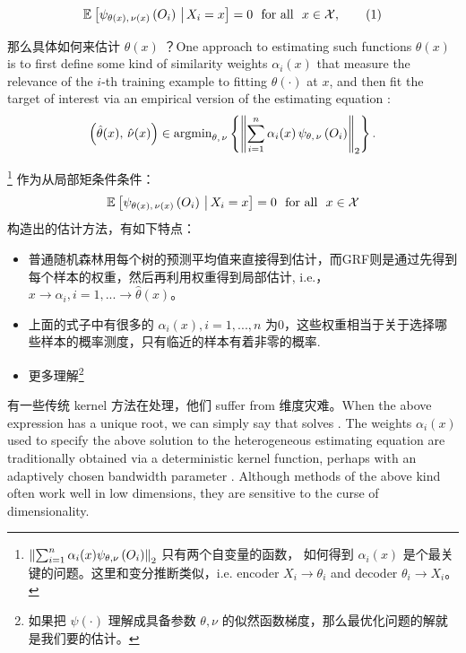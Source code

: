 \documentclass[aos]{imsart}
\theoremstyle{plain}
\theoremstyle{definition}
\theoremstyle{remark}
\begin{document}
\begin{CJK}{UTF8}{gbsn}
\begin{equation*}
\EE{\psi_{\theta(x), \, \nu(x)}\p{O_i} \cond X_i = x} = 0 \ \text{ for all } \ x \in \xx, \qquad (1)
\end{equation*}


那么具体如何来估计 $\theta(x)$ ？One approach to estimating such functions $\theta(x)$ is to first define
some kind of similarity weights $\alpha_i(x)$ that measure the relevance of the $i$-th training example to
fitting $\theta(\cdot)$ at $x$, and then fit the target of interest via an empirical version of
the estimating equation
\citep{fan1998local,newey1994kernel,staniswalis1989kernel,stone1977consistent,tibshirani1987local}:
\begin{equation}
\label{eq:gee_estimate}
\p{\htheta(x), \, \hnu(x)} \in \argmin_{\theta, \, \nu} \cb{\Norm{\sum_{i = 1}^n \alpha_i(x) \, \psi_{\theta, \, \nu}\p{O_i}}_2}.
\end{equation}



\noindent \footnote{ $\left\lVert\sum_{i = 1}^n \alpha_i(x)  \psi_{\theta,  \nu}\left(O_i\right)\right\rVert_2$ 只有两个自变量的函数， 如何得到 $\alpha_i(x)$ 是个最关键的问题。这里和变分推断类似，i.e. encoder $X_i \to \theta_i$ and decoder $\theta_i \to X_i$。} 作为从局部矩条件条件：
\begin{equation*}
\EE{\psi_{\theta(x), \, \nu(x)}\p{O_i} \cond X_i = x} = 0 \ \text{ for all } \ x \in \xx
\end{equation*}
构造出的估计方法，有如下特点：

\begin{itemize}
    \item 普通随机森林用每个树的预测平均值来直接得到估计，而GRF则是通过先得到每个样本的权重，然后再利用权重得到局部估计, i.e.， $x \to \alpha_i, i=1, ... \to \hat{\theta}(x)$。
    \item 上面的式子中有很多的 $\alpha_i(x), i=1,..., n$ 为0，这些权重相当于关于选择哪些样本的概率测度，只有临近的样本有着非零的概率.
    \item 更多理解\footnote{如果把 $\psi(\cdot)$ 理解成具备参数 $\theta, \nu$ 的似然函数梯度，那么最优化问题的解就是我们要的估计。}
\end{itemize}



有一些传统 kernel 方法在处理，他们 suffer from 维度灾难。When the above expression has a unique root, we can simply say that 
solves .
The weights $\alpha_i(x)$ used to specify the above solution to the heterogeneous estimating
equation are traditionally obtained via a deterministic kernel function, perhaps with an adaptively chosen
bandwidth parameter \citep{hastie2009elements}. Although methods of the above kind often work well in low dimensions, they
are sensitive to the curse of dimensionality.


\end{CJK}
\end{document}
